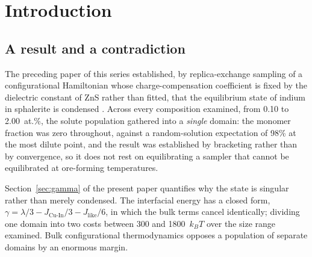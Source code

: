 \documentclass[11pt,a4paper]{article}
\newcommand{\JCuIn}{J_{\mathrm{Cu\text{-}In}}}
\newcommand{\Jlike}{J_{\mathrm{like}}}
\begin{document}
\begin{abstract}
Set against deposit classes whose cooling rates span eight orders of magnitude,
from quenched seafloor systems to basinal brines, the model reproduces the
observed ordering of inclusion size but implies an exponent near $0.45$, larger
than either simulation. We report the disagreement rather than the agreement.
It may reflect a crossover from interface-limited coarsening at the atomic scale
towards diffusion-limited coarsening as domains grow, in which case no single
exponent describes the whole range. Until it is resolved the inversion supports
ranking deposits by cooling rate, not calibrating one.

Two consequences follow regardless. A smooth LA-ICP-MS depth profile is
evidence of rapid cooling rather than of solid solution, since the indium is
aggregated but below the resolution of the ablation volume. And indium
deportment, and hence its metallurgical recovery, should differ systematically
between deposit classes along an axis predictable from thermal history.
\end{abstract}

\section{Introduction}
\label{sec:intro}

\subsection{A result and a contradiction}

The preceding paper of this series established, by replica-exchange sampling of
a configurational Hamiltonian whose charge-compensation coefficient is fixed by
the dielectric constant of ZnS rather than fitted, that the equilibrium state of
indium in sphalerite is condensed \citep{yu2026b}. Across every composition
examined, from 0.10 to 2.00~at.\%, the solute population gathered into a
\emph{single} domain: the monomer fraction was zero throughout, against a
random-solution expectation of 98\% at the most dilute point, and the result was
established by bracketing rather than by convergence, so it does not rest on
equilibrating a sampler that cannot be equilibrated at ore-forming temperatures.

Section~\ref{sec:gamma} of the present paper quantifies why the state is
singular rather than merely condensed. The interfacial energy has a closed form,
$\gamma = \lambda/3 - \JCuIn/3 - \Jlike/6$, in which the bulk terms cancel
identically; dividing one domain into two costs between 300 and 1800~$k_BT$ over
the size range examined. Bulk configurational thermodynamics opposes a
population of separate domains by an enormous margin.
\end{document}
